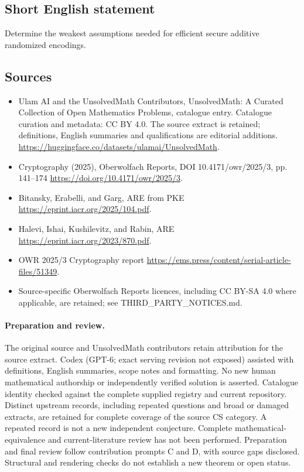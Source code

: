 \documentclass[11pt]{article}
\begin{document}
\subsection{Short English statement}
Determine the weakest assumptions needed for efficient secure additive randomized encodings.
\subsection{Sources}
\begin{itemize}
\item[\hypertarget{source:statement:1}{S1}] Ulam AI and the UnsolvedMath Contributors, UnsolvedMath: A Curated Collection of Open Mathematics Problems, catalogue entry. Catalogue curation and metadata: CC BY 4.0. The source extract is retained; definitions, English summaries and qualifications are editorial additions.
\url{https://huggingface.co/datasets/ulamai/UnsolvedMath}.
\item[\hypertarget{source:statement:2}{S2}] Cryptography (2025), Oberwolfach Reports, DOI 10.4171/owr/2025/3, pp. 141--174
\url{https://doi.org/10.4171/owr/2025/3}.
\item[\hypertarget{source:statement:3}{S3}] Bitansky, Erabelli, and Garg, ARE from PKE
\url{https://eprint.iacr.org/2025/104.pdf}.
\item[\hypertarget{source:statement:4}{S4}] Halevi, Ishai, Kushilevitz, and Rabin, ARE
\url{https://eprint.iacr.org/2023/870.pdf}.
\item[\hypertarget{source:statement:5}{S5}] OWR 2025/3 Cryptography report
\url{https://ems.press/content/serial-article-files/51349}.
\item Source-specific Oberwolfach Reports licences, including CC BY-SA 4.0 where applicable, are retained; see THIRD\_PARTY\_NOTICES.md.
\end{itemize}
\paragraph{Preparation and review.}
The original source and UnsolvedMath contributors retain attribution for the source extract. Codex (GPT-6; exact serving revision not exposed) assisted with definitions, English summaries, scope notes and formatting. No new human mathematical authorship or independently verified solution is asserted. Catalogue identity checked against the complete supplied registry and current repository. Distinct upstream records, including repeated questions and broad or damaged extracts, are retained for complete coverage of the source CS category. A repeated record is not a new independent conjecture. Complete mathematical-equivalence and current-literature review has not been performed. Preparation and final review follow contribution prompts C and D, with source gaps disclosed. Structural and rendering checks do not establish a new theorem or open status.
\label{end:statement}
\end{document}
